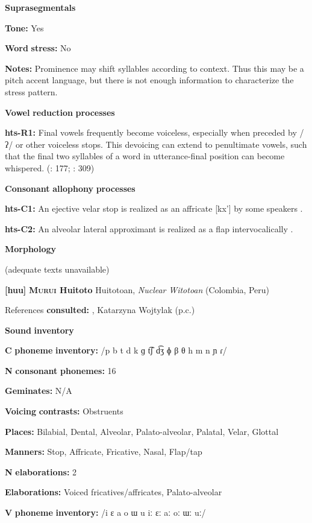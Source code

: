 \begin{styleBody}
\textbf{Suprasegmentals}

\textbf{Tone:} Yes

\textbf{Word} \textbf{stress:} No

\textbf{Notes:} Prominence may shift syllables according to context. Thus this may be a pitch accent language, but there is not enough information to characterize the stress pattern.

\textbf{Vowel} \textbf{reduction} \textbf{processes}

\textbf{hts-R1:} Final vowels frequently become voiceless, especially when preceded by /ʔ/ or other voiceless stops. This devoicing can extend to penultimate vowels, such that the final two syllables of a word in utterance-final position can become whispered. (\citealt{SandsEtAl1996}: 177; \citealt{TuckerEtAl1977}: 309)

\textbf{Consonant} \textbf{allophony} \textbf{processes}

\textbf{hts-C1:} An ejective velar stop is realized as an affricate [kx’] by some speakers \citep[41]{Sands2013}.

\textbf{hts-C2:} An alveolar lateral approximant is realized as a flap intervocalically \citep[41]{Sands2013}.

\textbf{Morphology}

(adequate texts unavailable)

\textbf{[huu]}   \textbf{\textsc{Murui} \textbf{Huitoto}  }  Huitotoan, \textit{Nuclear} \textit{Witotoan} (Colombia, Peru)

References \textbf{consulted:} \citet{Wojtylak2017}, Katarzyna Wojtylak (p.c.)

\textbf{Sound} \textbf{inventory}

\textbf{C} \textbf{phoneme} \textbf{inventory:} /p b t d k ɡ t͡ʃ d͡ʒ ɸ β θ h m n ɲ ɾ/

\textbf{N} \textbf{consonant} \textbf{phonemes:} 16

\textbf{Geminates:} N/A

\textbf{Voicing} \textbf{contrasts:} Obstruents

\textbf{Places:} Bilabial, Dental, Alveolar, Palato-alveolar, Palatal, Velar, Glottal

\textbf{Manners:} Stop, Affricate, Fricative, Nasal, Flap/tap

\textbf{N} \textbf{elaborations:} 2

\textbf{Elaborations:} Voiced fricatives/affricates, Palato-alveolar

\textbf{V} \textbf{phoneme} \textbf{inventory:} /i ɛ a o ɯ u iː ɛː aː oː ɯː uː/


\end{styleBody}
